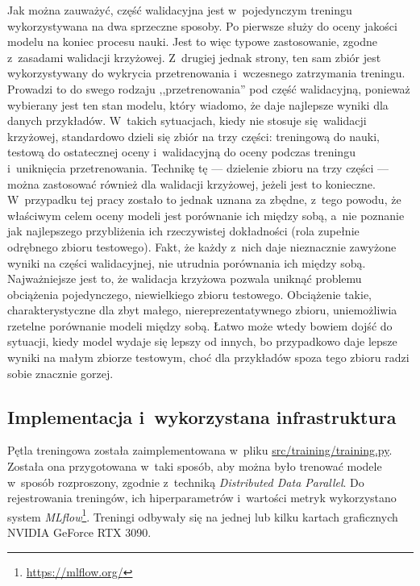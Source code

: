Jak można zauważyć, część walidacyjna jest w~pojedynczym treningu wykorzystywana na dwa sprzeczne sposoby. Po pierwsze służy do oceny jakości modelu na koniec procesu nauki. Jest to więc typowe zastosowanie, zgodne z~zasadami walidacji krzyżowej. Z~drugiej jednak strony, ten sam zbiór jest wykorzystywany do wykrycia przetrenowania i~wczesnego zatrzymania treningu. Prowadzi to do swego rodzaju ,,przetrenowania'' pod część walidacyjną, ponieważ wybierany jest ten stan modelu, który wiadomo, że daje najlepsze wyniki dla danych przykładów. W~takich sytuacjach, kiedy nie stosuje się walidacji krzyżowej, standardowo dzieli się zbiór na trzy części: treningową do nauki, testową do ostatecznej oceny i~walidacyjną do oceny podczas treningu i~uniknięcia przetrenowania. Technikę tę --- dzielenie zbioru na trzy części --- można zastosować również dla walidacji krzyżowej, jeżeli jest to konieczne. W~przypadku tej pracy zostało to jednak uznana za zbędne, z~tego powodu, że właściwym celem oceny modeli jest porównanie ich między sobą, a~nie poznanie jak najlepszego przybliżenia ich rzeczywistej dokładności (rola zupełnie odrębnego zbioru testowego). Fakt, że każdy z~nich daje nieznacznie zawyżone wyniki na części walidacyjnej, nie utrudnia porównania ich między sobą. Najważniejsze jest to, że walidacja krzyżowa pozwala uniknąć problemu obciążenia pojedynczego, niewielkiego zbioru testowego. Obciążenie takie, charakterystyczne dla zbyt małego, niereprezentatywnego zbioru, uniemożliwia rzetelne porównanie modeli między sobą. Łatwo może wtedy bowiem dojść do sytuacji, kiedy model wydaje się lepszy od innych, bo przypadkowo daje lepsze wyniki na małym zbiorze testowym, choć dla przykładów spoza tego zbioru radzi sobie znacznie gorzej.

\subsection{Implementacja i~wykorzystana infrastruktura}

Pętla treningowa została zaimplementowana w~pliku \url{src/training/training.py}. Została ona przygotowana w~taki sposób, aby można było trenować modele w~sposób rozproszony, zgodnie z~techniką \emph{Distributed Data Parallel}. Do rejestrowania treningów, ich hiperparametrów i~wartości metryk wykorzystano system \emph{MLflow}\footnote{\url{https://mlflow.org/}}. Treningi odbywały się na jednej lub kilku kartach graficznych NVIDIA GeForce RTX 3090.

